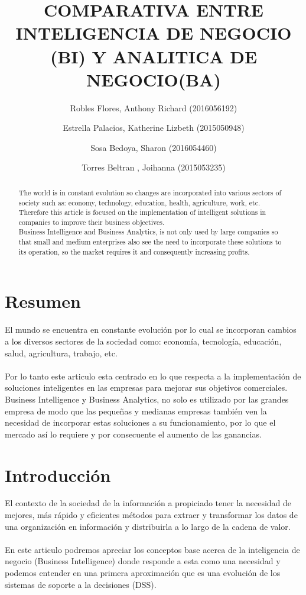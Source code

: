 \documentclass[preprint,12pt]{elsarticle}
\begin{document}
	
	\begin{frontmatter}

		\title{\huge  COMPARATIVA ENTRE INTELIGENCIA DE NEGOCIO (BI) Y ANALITICA DE NEGOCIO(BA) }
		\author{Robles Flores, Anthony Richard	                (2016056192)}
		\author{Estrella Palacios, Katherine Lizbeth			(2015050948)}
		\author{Sosa Bedoya, Sharon					(2016054460)}
		\author{Torres Beltran , Joihanna				(2015053235)}
		\address{Tacna, Perú}
		


\begin{abstract}
The world is in constant evolution so changes are incorporated into various sectors of society such as: economy, technology, education, health, agriculture, work, etc. 
Therefore this article is focused on the implementation of intelligent solutions in companies to improve their business objectives. 
\\
Business Intelligence and Business Analytics, is not only used by large companies so that small and medium enterprises also see the need to incorporate these solutions to its operation, so the market requires it and consequently increasing profits.
\end{abstract}


\end{frontmatter}

\section{Resumen}
El mundo se encuentra en constante evolución por lo cual se incorporan cambios a los diversos sectores de la sociedad como: economía, tecnología, educación, salud, agricultura, trabajo, etc. 
\\
\\
Por lo tanto este articulo esta centrado en lo que respecta a la implementación de soluciones inteligentes en las empresas para mejorar sus objetivos comerciales. 
Business Intelligence y Business Analytics,  no solo es utilizado por las grandes empresa de modo que las pequeñas y medianas empresas también ven la necesidad de incorporar estas soluciones a su funcionamiento, por lo que el mercado así lo requiere y por consecuente el aumento de las ganancias.


\section{Introducción}
El contexto de la sociedad de la información a propiciado tener la necesidad de mejores, más rápido y eficientes 
métodos para extraer y transformar los datos de una organización en información y distribuirla a lo largo de la 
cadena de valor.
\\
\\
En este articulo podremos apreciar los conceptos base acerca de la inteligencia de negocio (Business Intelligence)
 donde responde a esta como una necesidad y podemos entender en una primera aproximación que es una 
evolución de los sistemas de soporte a la decisiones (DSS).
\\
\end{document}
